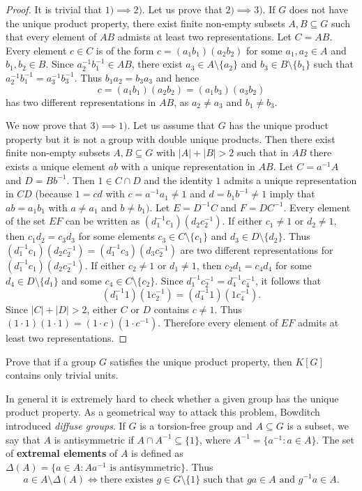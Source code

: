 \begin{proof}
	It is trivial that $1)\implies2)$.  Let us prove that 
	$2)\implies3)$. If $G$ does not have the unique product property, 
	there exist finite non-empty subsets 
	$A,B\subseteq G$ such that every element of 
	$AB$ admists at least two representations. Let $C=AB$. Every element $c\in C$ is 
	of the form $c=(a_1b_1)(a_2b_2)$ for some $a_1,a_2\in A$ and $b_1,b_2\in B$. Since 
	$a_2^{-1}b_1^{-1}\in AB$, there exist $a_3\in A\setminus\{a_2\}$ and
	$b_3\in B\setminus\{b_1\}$ such that 
	$a_2^{-1}b_1^{-1}=a_3^{-1}b_3^{-1}$. Thus $b_1a_2=b_3a_3$ and hence 
	\[
	c=(a_1b_1)(a_2b_2)=(a_1b_3)(a_3b_2)
	\]
	has two different representations in $AB$, 
	as $a_2\ne a_3$ and $b_1\ne b_3$.

	We now prove that $3)\implies1)$. Let us assume that $G$ has the unique product property 
	but it is not a group with double unique products. Then there exist 
	finite non-empty subsets 
	$A,B\subseteq G$ with $|A|+|B|>2$ such that 
	in $AB$ there exists a unique element $ab$ with a unique representation in $AB$.
	Let $C=a^{-1}A$ and $D=Bb^{-1}$. Then $1\in C\cap D$ and the identity 
	$1$ admits a unique representation in $CD$ (because $1=cd$ with 
	$c=a^{-1}a_1\ne 1$ and $d=b_1b^{-1}\ne 1$ imply that $ab=a_1b_1$ with $a\ne
	a_1$ and $b\ne b_1)$. Let $E=D^{-1}C$ and $F=DC^{-1}$. Every element of the set $EF$
	can be written as $(d_1^{-1}c_1)(d_2c_2^{-1})$. If either $c_1\ne 1$ or $d_2\ne 1$, 
	then $c_1d_2=c_3d_3$ for some elements $c_3\in C\setminus\{c_1\}$ and  
	$d_3\in D\setminus\{d_2\}$. Thus 
	$(d_1^{-1}c_1)(d_2c_2^{-1})=(d_1^{-1}c_3)(d_3c_2^{-1})$ are two different representations 
    for $(d_1^{-1}c_1)(d_2c_2^{-1})$. If either $c_2\ne 1$
	or $d_1\ne 1$, then $c_2d_1=c_4d_4$ for some $d_4\in D\setminus\{d_1\}$
	and some $c_4\in C\setminus\{c_2\}$. Since 
	$d_1^{-1}c_2^{-1}=d_4^{-1}c_4^{-1}$, it follows that 
	\[
	(d_1^{-1}1)(1c_2^{-1})=(d_4^{-1}1)(1c_4^{-1}).
	\]
	Since $|C|+|D|>2$, either $C$ or 
	$D$ contains $c\ne1$. Thus $(1\cdot 1)(1\cdot 1)=(1\cdot
	c)(1\cdot c^{-1})$. Therefore every element of $EF$ 
	admits at least two representations. 
\end{proof}

\begin{exercise}
	Prove that if a group $G$ satisfies the unique product property, then 
    $K[G]$ contains only trivial units.
\end{exercise}

In general it is extremely hard to check whether a given group
has the unique product property. As a geometrical way to 
attack this problem, Bowditch introduced \emph{diffuse groups}. If
$G$ is a torsion-free group and 
$A\subseteq G$ is a subset, we say that $A$ is antisymmetric 
if $A\cap A^{-1}\subseteq\{1\}$, where $A^{-1}=\{a^{-1}:a\in
A\}$. The set of \textbf{extremal elements} of $A$ is defined as 
$\Delta(A)=\{a\in A:Aa^{-1}\text{ is antisymmetric}\}$. 
Thus 
\[
	a\in A\setminus\Delta(A)
	\Longleftrightarrow
	\text{there existes $g\in G\setminus\{1\}$ such that $ga\in A$ and $g^{-1}a\in A$}.
\]

